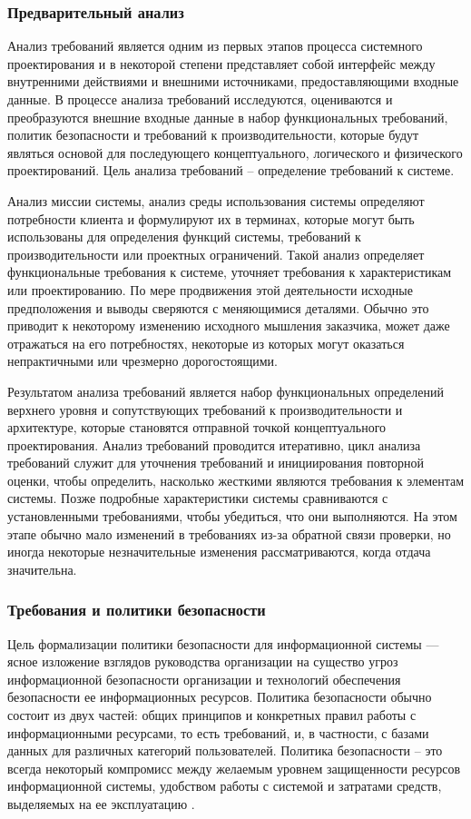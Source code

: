 \subsubsection{Предварительный анализ}

Анализ требований является одним из первых этапов процесса системного проектирования и в некоторой степени
представляет собой интерфейс между внутренними действиями и внешними источниками, предоставляющими входные
данные. В процессе анализа требований исследуются, оцениваются и преобразуются внешние входные данные в
набор функциональных требований, политик безопасности и требований к производительности, которые будут являться
основой для последующего концептуального, логического и физического проектирований. Цель анализа требований –
определение требований к системе.

Анализ миссии системы, анализ среды использования системы определяют потребности клиента и формулируют их в терминах,
которые могут быть использованы для определения функций системы, требований к производительности или проектных
ограничений. Такой анализ определяет функциональные требования к системе, уточняет требования к характеристикам
или проектированию. По мере продвижения этой деятельности исходные предположения и выводы сверяются с меняющимися
деталями. Обычно это приводит к некоторому изменению исходного мышления заказчика, может даже отражаться на его
потребностях, некоторые из которых могут оказаться непрактичными или чрезмерно дорогостоящими.

Результатом анализа требований является набор функциональных определений верхнего уровня и сопутствующих требований
к производительности и архитектуре, которые становятся отправной точкой концептуального проектирования. Анализ
требований проводится итеративно, цикл анализа требований служит для уточнения требований и инициирования
повторной оценки, чтобы определить, насколько жесткими являются требования к элементам системы. Позже подробные
характеристики системы сравниваются с установленными требованиями, чтобы убедиться, что они выполняются.
На этом этапе обычно мало изменений в требованиях из-за обратной связи проверки, но иногда некоторые незначительные
изменения рассматриваются, когда отдача значительна.

\subsubsection{Требования и политики безопасности}

Цель формализации политики безопасности для информационной системы — ясное изложение взглядов руководства
организации на существо угроз информационной безопасности организации и технологий обеспечения безопасности ее
информационных ресурсов. Политика безопасности обычно состоит из двух частей: общих принципов и конкретных правил
работы с информационными ресурсами, то есть требований, и, в частности, с базами данных для различных категорий
пользователей. Политика безопасности – это всегда некоторый компромисс между желаемым уровнем защищенности ресурсов
информационной системы, удобством работы с системой и затратами средств, выделяемых на ее эксплуатацию \autocite{shveikin}.

